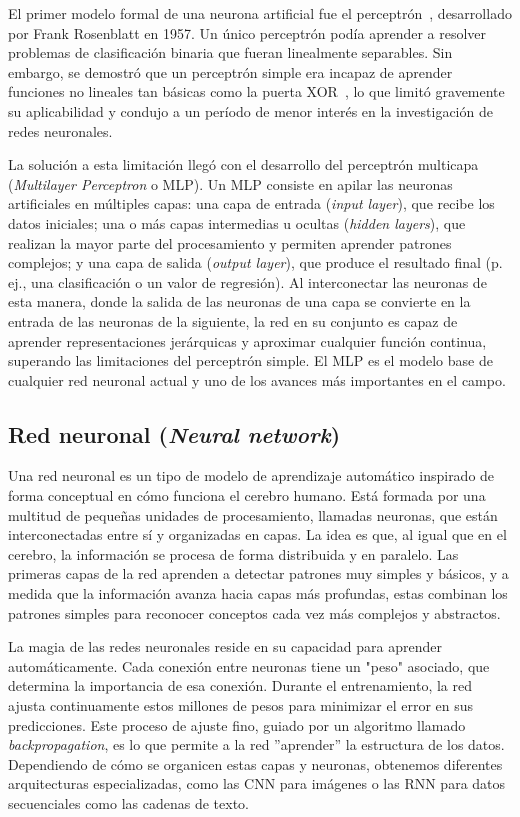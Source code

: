 El primer modelo formal de una neurona artificial fue el perceptrón~\cite{rosenblatt1958perceptron}, desarrollado por Frank Rosenblatt en 1957. Un único perceptrón podía aprender a resolver problemas de clasificación binaria que fueran linealmente separables. Sin embargo, se demostró que un perceptrón simple era incapaz de aprender funciones no lineales tan básicas como la puerta XOR~\cite{minsky2017perceptrons}, lo que limitó gravemente su aplicabilidad y condujo a un período de menor interés en la investigación de redes neuronales.

La solución a esta limitación llegó con el desarrollo del perceptrón multicapa (\textit{Multilayer Perceptron} o MLP). Un MLP consiste en apilar las neuronas artificiales en múltiples capas: una capa de entrada (\textit{input layer}), que recibe los datos iniciales; una o más capas intermedias u ocultas (\textit{hidden layers}), que realizan la mayor parte del procesamiento y permiten aprender patrones complejos; y una capa de salida (\textit{output layer}), que produce el resultado final (p. ej., una clasificación o un valor de regresión). Al interconectar las neuronas de esta manera, donde la salida de las neuronas de una capa se convierte en la entrada de las neuronas de la siguiente, la red en su conjunto es capaz de aprender representaciones jerárquicas y aproximar cualquier función continua, superando las limitaciones del perceptrón simple. El MLP es el modelo base de cualquier red neuronal actual y uno de los avances más importantes en el campo.

\subsection{Red neuronal (\textit{Neural network})}

Una red neuronal es un tipo de modelo de aprendizaje automático inspirado de forma conceptual en cómo funciona el cerebro humano. Está formada por una multitud de pequeñas unidades de procesamiento, llamadas neuronas, que están interconectadas entre sí y organizadas en capas. La idea es que, al igual que en el cerebro, la información se procesa de forma distribuida y en paralelo. Las primeras capas de la red aprenden a detectar patrones muy simples y básicos, y a medida que la información avanza hacia capas más profundas, estas combinan los patrones simples para reconocer conceptos cada vez más complejos y abstractos.

La magia de las redes neuronales reside en su capacidad para aprender automáticamente. Cada conexión entre neuronas tiene un "peso" asociado, que determina la importancia de esa conexión. Durante el entrenamiento, la red ajusta continuamente estos millones de pesos para minimizar el error en sus predicciones. Este proceso de ajuste fino, guiado por un algoritmo llamado \textit{backpropagation}, es lo que permite a la red ''aprender'' la estructura de los datos. Dependiendo de cómo se organicen estas capas y neuronas, obtenemos diferentes arquitecturas especializadas, como las CNN para imágenes o las RNN para datos secuenciales como las cadenas de texto.

